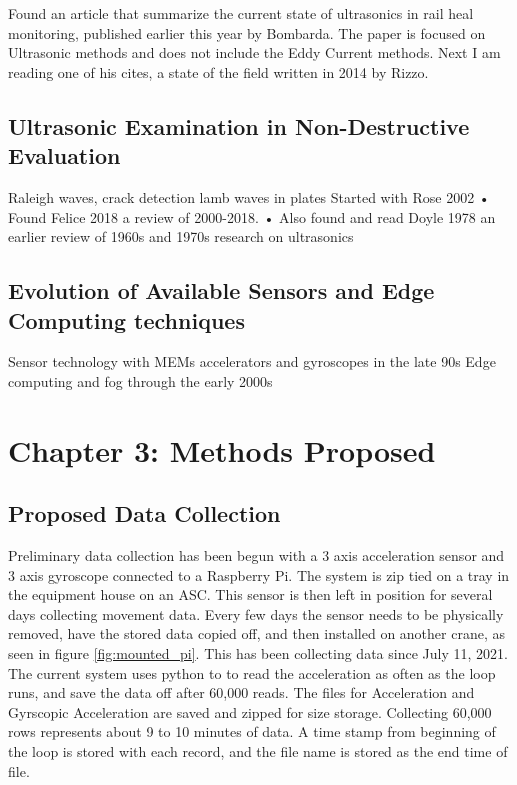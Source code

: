 \documentclass[journal=jacsat,manuscript=article]{achemso}
\begin{document}
Found an article that summarize the current state of ultrasonics in rail heal monitoring, published earlier this year by Bombarda\cite{bombarda_rail_2021}. The paper is focused on Ultrasonic methods and does not include the Eddy Current methods.
Next I am reading one of his cites, a state of the field written in 2014 by Rizzo\cite{rizzo_sensing_2014}.  


\subsection{Ultrasonic Examination in Non-Destructive Evaluation}
Raleigh waves, crack detection lamb waves in plates 
Started with Rose 2002
•         Found Felice 2018 a review of 2000-2018.
•         Also found and read Doyle 1978 an earlier review of 1960s and 1970s research on ultrasonics


\subsection{Evolution of Available Sensors and Edge Computing techniques}
Sensor technology with MEMs accelerators and gyroscopes in the late 90s Edge computing and fog through the early 2000s


\pagebreak
\section{Chapter 3: Methods Proposed}
\subsection{Proposed Data Collection}

Preliminary data collection has been begun with a 3 axis acceleration sensor and 3 axis gyroscope connected to a Raspberry Pi.  The system is zip tied on a tray in the equipment house on an ASC.  This sensor is then left in position for several days collecting movement data.  Every few days the sensor needs to be physically removed, have the stored data copied off, and then installed on another crane, as seen in figure \ref{fig:mounted_pi}.  This has been collecting data since July 11, 2021.  The current system uses python to to read the acceleration as often as the loop runs, and save the data off after 60,000 reads.  The files for Acceleration and Gyrscopic Acceleration are saved and zipped for size storage.  Collecting 60,000 rows represents about 9 to 10 minutes of data.  A time stamp from beginning of the loop is stored with each record, and the file name is stored as the end time of file.  
\end{document}
